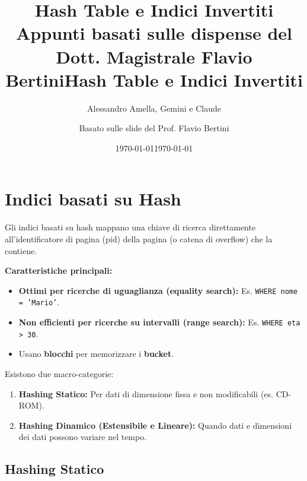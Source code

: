 

\usepackage{hyperref}

\title{Hash Table e Indici Invertiti
  \large Appunti basati sulle dispense del Dott. Magistrale Flavio Bertini}
\author{Alessandro Amella, Gemini e Claude}
\date{\today}

\title{Hash Table e Indici Invertiti}
\author{Basato sulle slide del Prof. Flavio Bertini}
\date{\today}



\maketitle
\tableofcontents
\newpage

\section{Indici basati su Hash}

Gli indici basati su hash mappano una chiave di ricerca direttamente all'identificatore di pagina (pid) della pagina (o catena di overflow) che la contiene.

\textbf{Caratteristiche principali:}
\begin{itemize}
    \item \textbf{Ottimi per ricerche di uguaglianza (equality search):} Es. \texttt{WHERE nome = 'Mario'}.
    \item \textbf{Non efficienti per ricerche su intervalli (range search):} Es. \texttt{WHERE eta > 30}.
    \item Usano \textbf{blocchi} per memorizzare i \textbf{bucket}.
\end{itemize}

Esistono due macro-categorie:
\begin{enumerate}
    \item \textbf{Hashing Statico:} Per dati di dimensione fissa e non modificabili (es. CD-ROM).
    \item \textbf{Hashing Dinamico (Estensibile e Lineare):} Quando dati e dimensioni dei dati possono variare nel tempo.
\end{enumerate}

\subsection{Hashing Statico}

